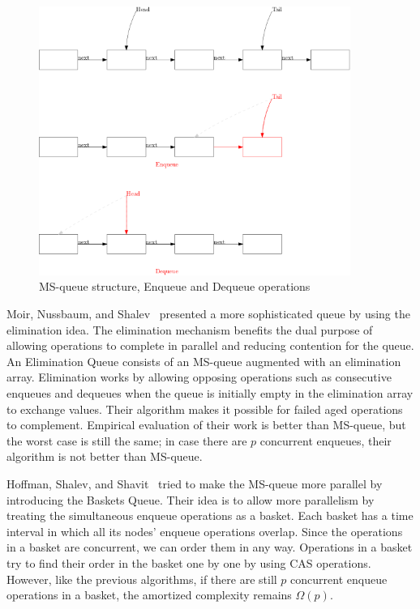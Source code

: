 \documentclass[12pt]{article}
\begin{document}
\begin{figure}[hbt]
  \center\includegraphics[width=4in]{pics/msqueue}
  \caption{MS-queue structure, Enqueue and Dequeue operations}
\end{figure}


Moir, Nussbaum, and Shalev~\cite{DBLP:conf/spaa/MoirNSS05} presented a more sophisticated queue by using the elimination idea. The elimination mechanism benefits the dual purpose of allowing operations to complete in parallel and reducing contention for the queue. An Elimination Queue consists of an MS-queue augmented with an elimination array. Elimination works by allowing opposing operations such as consecutive enqueues and dequeues when the queue is initially empty in the elimination array to exchange values. Their algorithm makes it possible for failed aged operations to complement. Empirical evaluation of their work is better than MS-queue, but the worst case is still the same; in case there are $p$ concurrent enqueues, their algorithm is not better than MS-queue. 


Hoffman, Shalev, and Shavit~\cite{DBLP:conf/opodis/HoffmanSS07} tried to make the MS-queue more parallel by introducing the Baskets Queue. Their idea is to allow more parallelism by treating the simultaneous enqueue operations as a basket. Each basket has a time interval in which all its nodes’ enqueue operations overlap. Since the operations in a basket are concurrent, we can order them in any way. Operations in a basket try to find their order in the basket one by one by using CAS operations. However, like the previous algorithms, if there are still $p$ concurrent enqueue operations in a basket, the amortized complexity remains $\Omega(p)$.
\end{document}
